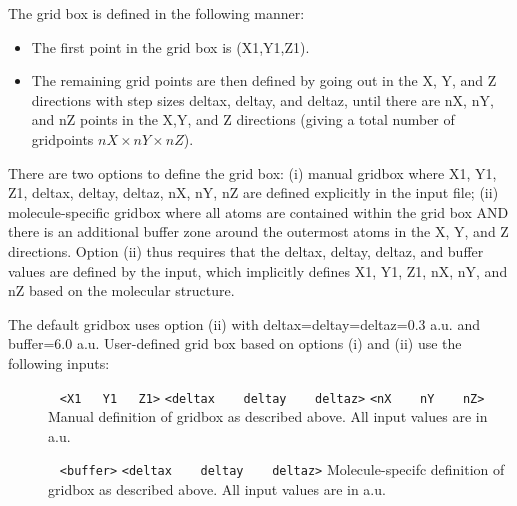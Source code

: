 The grid box is defined in the following manner:
\begin{itemize}
\item
The first point in the grid box is (X1,Y1,Z1).                                                 
\item
The remaining grid points are then defined by going out in the X, Y, and Z directions with step sizes deltax, deltay, and deltaz, until there are nX, nY, and nZ points in the X,Y, and Z directions (giving a total number of gridpoints $nX\times nY \times nZ$).      
\end{itemize}

There are two options to define the grid box: (i) manual gridbox where X1, Y1, Z1, deltax, deltay, deltaz, nX, nY, nZ are defined explicitly in the input file; (ii)
molecule-specific gridbox where all atoms are contained within the grid box AND there is an additional buffer zone around the outermost atoms in the X, Y, and Z directions. Option (ii) thus requires that the deltax, deltay, deltaz, and buffer values are defined by the input, which implicitly defines X1, Y1, Z1, nX, nY, and nZ based on the molecular structure.

The default gridbox uses option (ii) with {deltax=deltay=deltaz=0.3 a.u.} and {buffer=6.0 a.u}. 
User-defined grid box based on options (i) and (ii) use the following inputs:


\begin{description}
\item[] \verb| | \newline
\verb|<X1   Y1   Z1>| \newline
\verb|<deltax    deltay    deltaz>| \newline
\verb|<nX    nY    nZ>| \newline
Manual definition of gridbox as described above. All input values are in a.u.

\item[] \verb| | \newline
\verb|<buffer>| \newline
\verb|<deltax    deltay    deltaz>| \newline
Molecule-specifc definition of gridbox as described above. All input values are in a.u.

\end{description}

